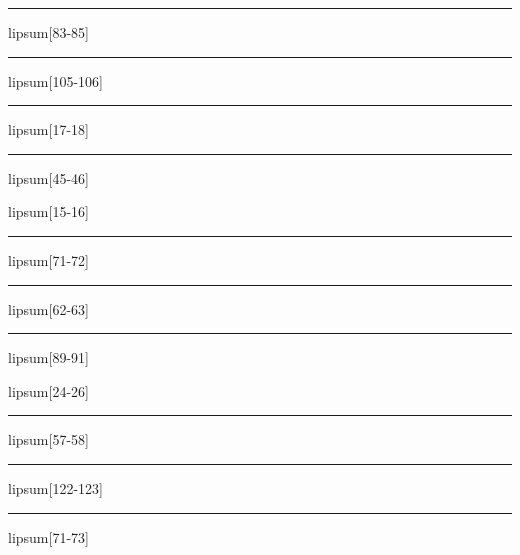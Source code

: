 \documentclass[11pt,a4paper]{article}
\begin{document}
\begin{simplewrap}
  \textcolor{orange!24}{\rule{3.4cm}{9.8cm}}
\end{simplewrap}
lipsum[83-85]

\begin{simplewrap}
  \textcolor{olive!48}{\rule{4.9cm}{3.5cm}}
\end{simplewrap}
lipsum[105-106]

\begin{simplewrap}
  \textcolor{cyan!33}{\rule{5.5cm}{6.1cm}}
\end{simplewrap}
lipsum[17-18]

\begin{simplewrap}
  \textcolor{cyan!35}{\rule{3.4cm}{8.8cm}}
\end{simplewrap}
lipsum[45-46]

lipsum[15-16]

\begin{simplewrap}
  \textcolor{magenta!12}{\rule{4.4cm}{9.3cm}}
\end{simplewrap}
lipsum[71-72]

\begin{simplewrap}
  \textcolor{blue!42}{\rule{4.2cm}{9.4cm}}
\end{simplewrap}
lipsum[62-63]

\begin{simplewrap}
  \textcolor{blue!21}{\rule{5.9cm}{5.8cm}}
\end{simplewrap}
lipsum[89-91]

lipsum[24-26]

\begin{simplewrap}
  \textcolor{violet!11}{\rule{4.2cm}{3.3cm}}
\end{simplewrap}
lipsum[57-58]

\begin{simplewrap}
  \textcolor{yellow!27}{\rule{5.0cm}{6.1cm}}
\end{simplewrap}
lipsum[122-123]

\begin{simplewrap}
  \textcolor{cyan!48}{\rule{5.4cm}{3.8cm}}
\end{simplewrap}
lipsum[71-73]
\end{document}
